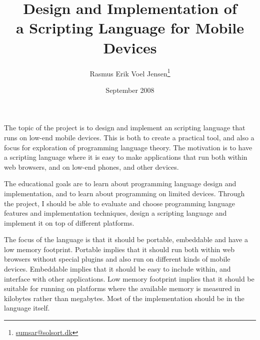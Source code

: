 \documentclass[12pt]{article}
\title{Design and Implementation of \\ a Scripting Language for Mobile Devices}
\author{Rasmus Erik Voel Jensen\footnote{\url{sumsar@solsort.dk}}
}
\date{September 2008}
\begin{document}
\maketitle





The topic of the project is to design and implement an scripting language  that runs on low-end mobile devices. This is both to create a practical tool, and also a focus for exploration of programming language theory.
The motivation is to have a scripting language where it is easy to make applications that run both within web browsers, and on low-end phones, and other devices.

The educational goals are 
to learn about programming language design and implementation, 
and to learn about programming on limited devices.
Through the project, I should be able to evaluate and choose programming language features and implementation techniques, design a scripting language and implement it on top of different platforms.

The focus of the language is that it should be portable, embeddable and have a low memory footprint. 
Portable implies that it should run both within web browsers without special plugins and also run on different kinds of mobile devices.
Embeddable implies that it should be easy to include within, and interface with other applications.
Low memory footprint implies that it should be suitable for running on platforms where the available memory is measured in kilobytes rather than megabytes.
Most of the implementation should be in the language itself.
\end{document}
